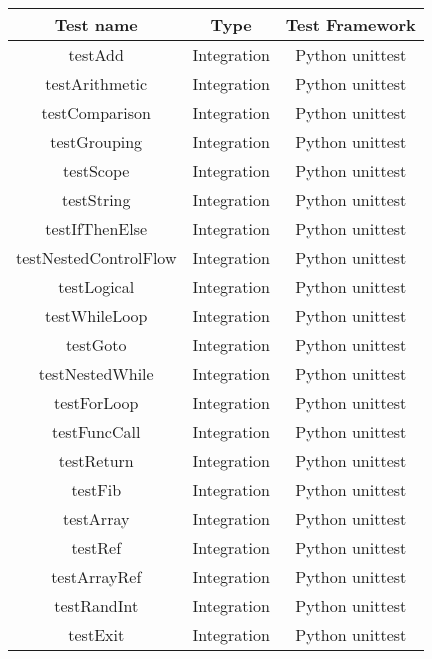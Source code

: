 \documentclass[manuscript,screen,nonacm]{acmart}
\begin{document}
\begin{center}
\begin{tabular}{|c|c|c|}
    \hline
    Test name & Type & Test Framework \\
    \hline
    testAdd & Integration & Python unittest \\
    testArithmetic & Integration & Python unittest \\
    testComparison & Integration & Python unittest \\
    testGrouping & Integration & Python unittest \\
    testScope & Integration & Python unittest \\
    testString & Integration & Python unittest \\
    testIfThenElse & Integration & Python unittest \\
    testNestedControlFlow & Integration & Python unittest \\
    testLogical & Integration & Python unittest \\
    testWhileLoop & Integration & Python unittest \\
    testGoto & Integration & Python unittest \\
    testNestedWhile & Integration & Python unittest \\
    testForLoop & Integration & Python unittest \\
    testFuncCall & Integration & Python unittest \\
    testReturn & Integration & Python unittest \\
    testFib & Integration & Python unittest \\
    testArray & Integration & Python unittest \\
    testRef & Integration & Python unittest \\
    testArrayRef & Integration & Python unittest \\
    testRandInt & Integration & Python unittest \\
    testExit & Integration & Python unittest \\
    \hline
\end{tabular}
\end{center}
\end{document}
